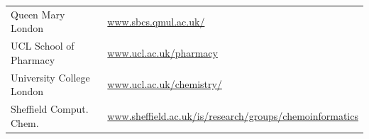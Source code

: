\begin{table}[H]
\begin{tabular}{||p{4cm}|Y||}
 \footnotesize{Queen Mary London      }            & \footnotesize{\url{www.sbcs.qmul.ac.uk/}}                                                                                                          \\
 \footnotesize{UCL School of Pharmacy}             & \footnotesize{\url{www.ucl.ac.uk/pharmacy}}                                                                                                        \\
 \footnotesize{University College London}          & \footnotesize{\url{www.ucl.ac.uk/chemistry/}}                                                                                                      \\
 \footnotesize{Sheffield Comput. Chem.}  & \footnotesize{\url{www.sheffield.ac.uk/is/research/groups/chemoinformatics}}   
 \\
 \hline
\end{tabular}
\end{table}

